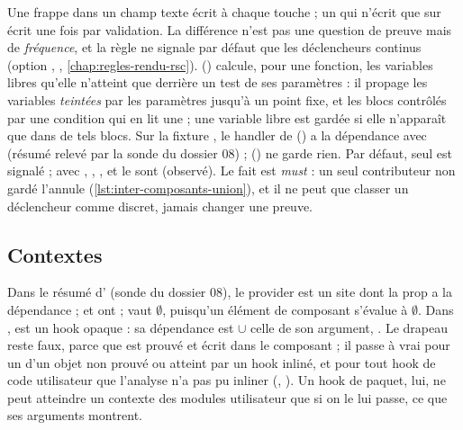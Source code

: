 Une frappe dans un champ texte écrit à chaque touche ; un  qui n'écrit que sur
 écrit une fois par validation. La différence n'est pas une question de preuve mais
de \emph{fréquence}, et la règle  ne signale par défaut que les
déclencheurs continus (option , , \cref{chap:regles-rendu-rsc}).
 () calcule, pour une fonction,
les variables libres qu'elle n'atteint que derrière un test de ses paramètres : il propage les
variables \emph{teintées} par les paramètres jusqu'à un point fixe, et les blocs contrôlés par
une condition qui en lit une ; une variable libre est gardée si elle n'apparaît que dans de tels
blocs. Sur la fixture , le handler de
 () a la dépendance
 avec  (résumé relevé par la sonde du dossier 08) ;
 () ne garde rien. Par défaut, seul
 est signalé ; avec , , ,
 et  le sont (observé). Le fait est \emph{must} : un seul contributeur
non gardé l'annule (\cref{lst:inter-composants-union}), et il ne peut que classer un
déclencheur comme discret, jamais changer une preuve.

\subsection{Contextes}
\label{sec:inter-composants-contextes}


Dans le résumé d' (sonde du dossier 08), le provider est un site
 dont la prop  a la dépendance
 ;  et  ont  ;
 vaut $\emptyset$, puisqu'un élément de composant s'évalue à $\emptyset$. Dans
,  est un hook opaque : sa dépendance est 
$\cup$ celle de son argument, . Le drapeau  reste faux,
parce que  est prouvé et écrit dans le composant ; il passe à vrai pour un
 d'un objet non prouvé ou atteint par un hook inliné, et pour tout hook de code
utilisateur que l'analyse n'a pas pu inliner (,
). Un hook de paquet, lui, ne peut atteindre un contexte
des modules utilisateur que si on le lui passe, ce que ses arguments montrent.


